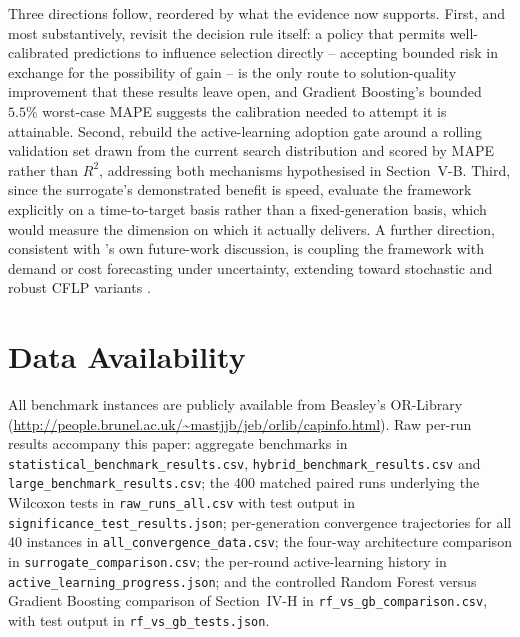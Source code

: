 \documentclass[conference]{IEEEtran}
\begin{document}
Three directions follow, reordered by what the evidence now supports. First,
and most substantively, revisit the decision rule itself: a policy that permits
well-calibrated predictions to influence selection directly -- accepting
bounded risk in exchange for the possibility of gain -- is the only route to
solution-quality improvement that these results leave open, and Gradient
Boosting's bounded $5.5\%$ worst-case MAPE suggests the calibration needed to
attempt it is attainable. Second, rebuild the active-learning adoption gate
around a rolling validation set drawn from the current search distribution and
scored by MAPE rather than $R^2$, addressing both mechanisms hypothesised in
Section~V-B. Third, since the surrogate's demonstrated benefit is speed,
evaluate the framework explicitly on a time-to-target basis rather than a
fixed-generation basis, which would measure the dimension on which it actually
delivers. A further direction, consistent with \citep{ozsoydan2023}'s own
future-work discussion, is coupling the framework with demand or cost
forecasting under uncertainty, extending toward stochastic and robust CFLP
variants \citep{saif2021,rahmati2021}.

\section*{Data Availability}

All benchmark instances are publicly available from Beasley's OR-Library
(\url{http://people.brunel.ac.uk/~mastjjb/jeb/orlib/capinfo.html}). Raw
per-run results accompany this paper: aggregate benchmarks in
\texttt{statistical\_benchmark\_results.csv},
\texttt{hybrid\_benchmark\_results.csv} and
\texttt{large\_benchmark\_results.csv}; the 400 matched paired runs underlying
the Wilcoxon tests in \texttt{raw\_runs\_all.csv} with test output in
\texttt{significance\_test\_results.json}; per-generation convergence
trajectories for all 40 instances in \texttt{all\_convergence\_data.csv}; the
four-way architecture comparison in \texttt{surrogate\_comparison.csv}; the
per-round active-learning history in
\texttt{active\_learning\_progress.json}; and the controlled Random Forest
versus Gradient Boosting comparison of Section~IV-H in
\texttt{rf\_vs\_gb\_comparison.csv}, with test output in
\texttt{rf\_vs\_gb\_tests.json}.
\end{document}
